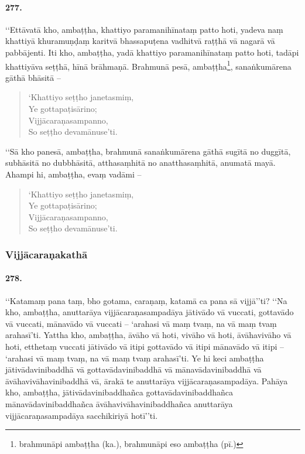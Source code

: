 \paragraph{277.} ‘‘Ettāvatā kho, ambaṭṭha, khattiyo paramanihīnataṃ patto hoti, yadeva naṃ khattiyā khuramuṇḍaṃ karitvā bhassapuṭena vadhitvā raṭṭhā vā nagarā vā pabbājenti. Iti kho, ambaṭṭha, yadā khattiyo paramanihīnataṃ patto hoti, tadāpi khattiyāva seṭṭhā, hīnā brāhmaṇā. Brahmunā pesā, ambaṭṭha\footnote{brahmunāpi ambaṭṭha (ka.), brahmunāpi eso ambaṭṭha (pī.)}, sanaṅkumārena gāthā bhāsitā –

\begin{verse}
  ‘Khattiyo seṭṭho janetasmiṃ,\\
  Ye gottapaṭisārino;\\
  Vijjācaraṇasampanno,\\
  So seṭṭho devamānuse’ti.\\
\end{verse}
‘‘Sā kho panesā, ambaṭṭha, brahmunā sanaṅkumārena gāthā sugītā no duggītā, subhāsitā no dubbhāsitā, atthasaṃhitā no anatthasaṃhitā, anumatā mayā. Ahampi hi, ambaṭṭha, evaṃ vadāmi –

\begin{verse}
  ‘Khattiyo seṭṭho janetasmiṃ,\\
  Ye gottapaṭisārino;\\
  Vijjācaraṇasampanno,\\
  So seṭṭho devamānuse’ti.\\
\end{verse}


\subsubsection{Vijjācaraṇakathā}

\paragraph{278.} ‘‘Katamaṃ pana taṃ, bho gotama, caraṇaṃ, katamā ca pana sā vijjā’’ti? ‘‘Na kho, ambaṭṭha, anuttarāya vijjācaraṇasampadāya jātivādo vā vuccati, gottavādo vā vuccati, mānavādo vā vuccati – ‘arahasi vā maṃ tvaṃ, na vā maṃ tvaṃ arahasī’ti. Yattha kho, ambaṭṭha, āvāho vā hoti, vivāho vā hoti, āvāhavivāho vā hoti, etthetaṃ vuccati jātivādo vā itipi gottavādo vā itipi mānavādo vā itipi – ‘arahasi vā maṃ tvaṃ, na vā maṃ tvaṃ arahasī’ti. Ye hi keci ambaṭṭha jātivādavinibaddhā vā gottavādavinibaddhā vā mānavādavinibaddhā vā āvāhavivāhavinibaddhā vā, ārakā te anuttarāya vijjācaraṇasampadāya. Pahāya kho, ambaṭṭha, jātivādavinibaddhañca gottavādavinibaddhañca mānavādavinibaddhañca āvāhavivāhavinibaddhañca anuttarāya vijjācaraṇasampadāya sacchikiriyā hotī’’ti.

